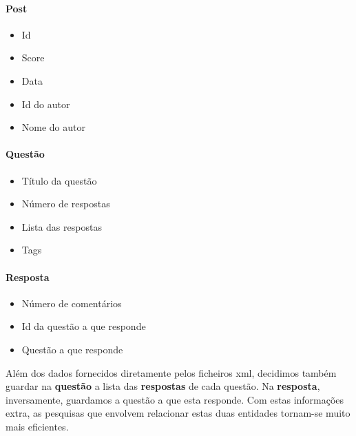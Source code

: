 \documentclass[10pt,a4paper]{report}
\begin{document}
        \paragraph{Post}
            \begin{multicols}{3}
            \begin{itemize}
                \item Id
                \item Score
                \item Data
                \item Id do autor
                \item Nome do autor
            \end{itemize}
        \paragraph{Questão}
            \begin{itemize}
                \item Título da questão
                \item Número de respostas
                \item Lista das respostas
                \item Tags
            \end{itemize}

        \paragraph{Resposta}
            \begin{itemize}
                \item Número de comentários
                \item Id da questão a que responde
                \item Questão a que responde
            \end{itemize}
            \end{multicols}

    Além dos dados fornecidos diretamente pelos ficheiros xml, decidimos também
    guardar na \textbf{questão} a lista das \textbf{respostas} de cada questão.
    Na \textbf{resposta}, inversamente, guardamos a questão a que esta responde.
    Com estas informações extra, as pesquisas que envolvem relacionar estas duas
    entidades tornam-se muito mais
    eficientes.
\end{document}
